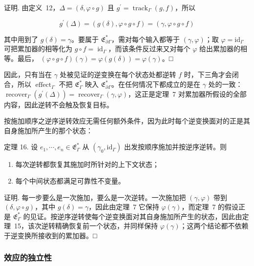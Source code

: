 \documentclass[
  10
]{article}
\begin{document}
证明. 由定义~12，\(\Delta = ( \delta , \varphi \circ g )\) 且
\(g ^ { \prime } = \operatorname { t r a c k } _ { \Gamma } ( g , f )\)，所以

\[
g ^ { \prime } ( \Delta ) = ( g ( \delta ) , \varphi \circ g \circ f ) = ( \gamma , \varphi \circ g \circ f )
\]

其中用到了 \(g ( \delta ) = \gamma\)。要属于 \(\mathfrak { E } _ { \partial \Gamma } ^ { * }\)，需对每个输入都等于
\(( \gamma , \varphi )\)；取 \(\varphi = \mathrm { i d } _ { \Gamma }\) 可把累加器的相等化为
\(g \circ f = \operatorname { i d } _ { \Gamma }\)，而该条件反过来又对每个 \(\varphi\) 给出累加器的相等。最后，
\(( \varphi \circ g \circ f ) ( \gamma ) = \varphi ( g ( \delta ) ) = \varphi ( \gamma )\)。□

因此，只有当在 \(\gamma\) 处被见证的逆变换在每个状态处都逆转 \(f\) 时，下三角才会闭合，所以
\(\operatorname { e f f e c t } _ { \Gamma }\) 不把 \(\mathfrak { E } _ { \Gamma } ^ { * }\) 映入
\(\mathfrak { E } _ { \partial \Gamma } ^ { * }\)。在任何情况下都成立的是在 \(\gamma\) 处的一致：
\(\operatorname { r e c o v e r } _ { \Gamma } ( g ^ { \prime } ( \Delta ) ) = \operatorname { r e c o v e r } _ { \Gamma } ( \gamma , \varphi )\)，这正是定理~7 对累加器所假设的全部内容，因此逆转不会触及恢复目标。

按施加顺序之逆序逆转效应无需任何额外条件，因为此时每个逆变换面对的正是其自身施加所产生的那个状态：

定理 16. 设 \(e _ { 1 } , \cdots , e _ { n } \in \mathfrak { E } _ { \Gamma } ^ { * }\) 从
\(( \gamma _ { 0 } , \mathrm { i d } _ { \Gamma } )\) 出发按顺序施加并按逆序逆转。则

\begin{enumerate}
\def\labelenumi{\arabic{enumi}.}
\item
  每次逆转都恢复其施加时所针对的上下文状态；
\item
  每个中间状态都满足可靠性不变量。
\end{enumerate}

证明. 每一步要么是一次施加，要么是一次逆转。一次施加把 \(( \gamma , \varphi )\) 带到
\(( \delta , \varphi \circ g )\)，其中 \(g ( \delta ) = \gamma\)，因此由定理~7 它保持
\(\varphi ( \gamma )\)，而定理~7 的假设正是 \(\mathfrak { E } _ { \Gamma } ^ { * }\) 的见证。按逆序逆转使每个逆变换面对其自身施加所产生的状态，因此由定理~15，该次逆转精确恢复前一个状态，并同样保持
\(\varphi ( \gamma )\)；这两个结论都不依赖于逆变换所接收到的累加器。□

\subsubsection{效应的独立性} \label{independence-of-efects}
\end{document}
